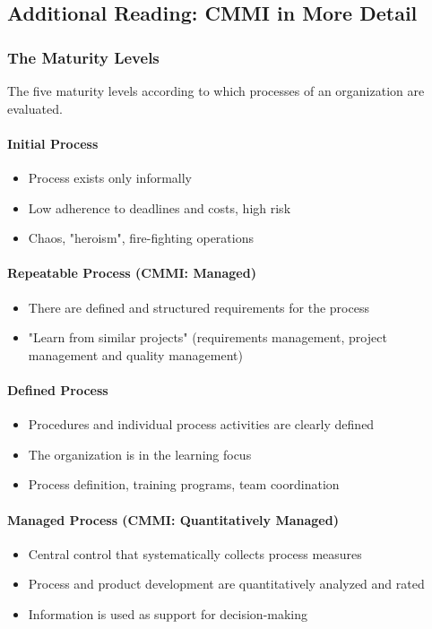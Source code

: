 \documentclass[11pt,a4paper]{article}
\begin{document}
\subsection{Additional Reading: CMMI in More Detail}

\subsubsection{The Maturity Levels}

The five maturity levels according to which processes of an organization are
evaluated.

\paragraph {Initial Process}
\begin {itemize} 
\item Process exists only informally
\item Low adherence to deadlines and costs, high risk
\item Chaos, "heroism", fire-fighting operations
\end {itemize}

\paragraph {Repeatable Process (CMMI: Managed)}
\begin {itemize} 
\item There are defined and structured requirements for the process
\item "Learn from similar projects" (requirements management, project
  management and quality management)
\end {itemize}

\paragraph {Defined Process}
\begin {itemize} 
\item Procedures and individual process activities are clearly defined
\item The organization is in the learning focus
\item Process definition, training programs, team coordination
\end {itemize}

\paragraph {Managed Process (CMMI: Quantitatively Managed)}
\begin {itemize} 
\item Central control that systematically collects process measures
\item Process and product development are quantitatively analyzed and rated
\item Information is used as support for decision-making 
\end {itemize}
\end{document}
